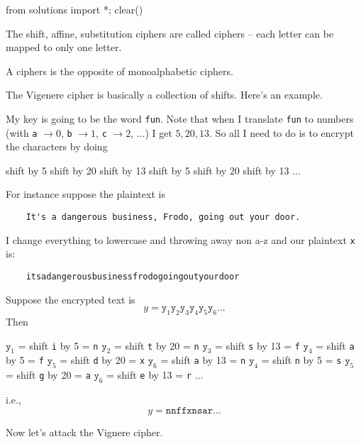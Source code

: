 \begin{python0}
from solutions import *; clear()
\end{python0}

\newcommand\aaa{\texttt{a}}
\newcommand\yy{\texttt{y}}

The shift, affine, substitution ciphers are called
ciphers --
each letter can be mapped to only one letter.

A
ciphers is the opposite
of monoalphabetic ciphers.


The Vigenere cipher is basically a collection of shifts.
Here's an example.

My key is going to be the word \verb!fun!.
Note that when I translate \verb!fun! to numbers
(with
\verb!a! $\rightarrow 0$,
\verb!b! $\rightarrow 1$,
\verb!c! $\rightarrow 2$, ...)
I get $5, 20, 13$.
So all I need to do is to encrypt the characters by doing
\begin{tightlist}
  \li shift by 5
  \li shift by 20
  \li shift by 13
  \li shift by 5
  \li shift by 20
  \li shift by 13
  \li ...
\end{tightlist}
  For instance suppose the plaintext is

\verb!    It's a dangerous business, Frodo, going out your door.!

I change everything to lowercase and throwing away non a-z
and our plaintext \verb!x! is:

\verb!    itsadangerousbusinessfrodogoingoutyourdoor!

Suppose the encrypted text is
\[
  y =
  \texttt{y}_1
  \texttt{y}_2
  \texttt{y}_3
  \texttt{y}_4
  \texttt{y}_5
  \texttt{y}_6
  ...
\]
Then
\begin{tightlist}
  \li $\yy_1$ = shift \verb!i! by 5 = \verb!n!
  \li $\yy_2$ = shift \verb!t! by 20 = \verb!n!
  \li $\yy_3$ = shift \verb!s! by 13 = \verb!f!
  \li $\yy_4$ = shift \verb!a! by 5 = \verb!f!
  \li $\yy_5$ = shift \verb!d! by 20 = \verb!x!
  \li $\yy_6$ = shift \verb!a! by 13 = \verb!n!
  \li $\yy_4$ = shift \verb!n! by 5 = \verb!s!
  \li $\yy_5$ = shift \verb!g! by 20 = \verb!a!
  \li $\yy_6$ = shift \verb!e! by 13 = \verb!r!
  \li ...
\end{tightlist}
i.e.,
\[
  y =
  \texttt{nnffxnsar}...
\]



Now let's attack the Vignere cipher.

